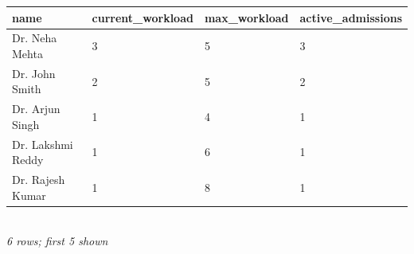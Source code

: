 {\scriptsize\setlength{\tabcolsep}{2.5pt}\begin{tabular}{llll}\toprule
\textbf{name} & \textbf{current\_workload} & \textbf{max\_workload} & \textbf{active\_admissions} \\\midrule
Dr. Neha Mehta & 3 & 5 & 3 \\
Dr. John Smith & 2 & 5 & 2 \\
Dr. Arjun Singh & 1 & 4 & 1 \\
Dr. Lakshmi Reddy & 1 & 6 & 1 \\
Dr. Rajesh Kumar & 1 & 8 & 1 \\
\bottomrule\end{tabular}}\\[-1pt]{\tiny\itshape 6 rows; first 5 shown}
